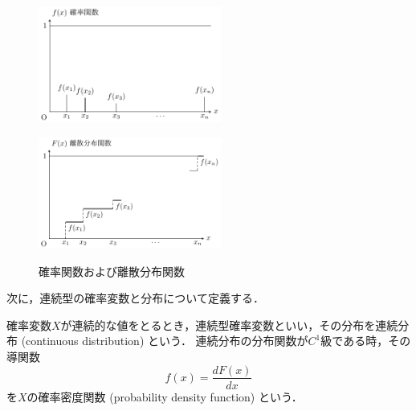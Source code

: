 \documentclass{jsreport}
\begin{document}
\begin{figure}[htb]
  \begin{minipage}[b]{0.5\linewidth}
    \centering
    \includegraphics[clip, width=6cm]{../figure/dpf.pdf}
    \label{fig:dpf}
  \end{minipage}
  \begin{minipage}[b]{0.5\linewidth}
    \centering
    \includegraphics[clip, width=6cm]{../figure/dpdf.pdf}
    \label{fig:dpdf}
  \end{minipage}
  \caption{確率関数および離散分布関数}\label{fig:dis}
\end{figure}

次に，連続型の確率変数と分布について定義する．

\begin{screen}
  \begin{defi}[連続分布]
    確率変数$X$が連続的な値をとるとき，連続型確率変数といい，その分布を連続分布 (continuous distribution) という．
    連続分布の分布関数が$C^1$級である時，その導関数
    \begin{equation}
      f(x) = \frac{dF(x)}{dx} \nonumber
    \end{equation}
    を$X$の確率密度関数 (probability density function) という．
  \end{defi}
\end{screen}
\end{document}
